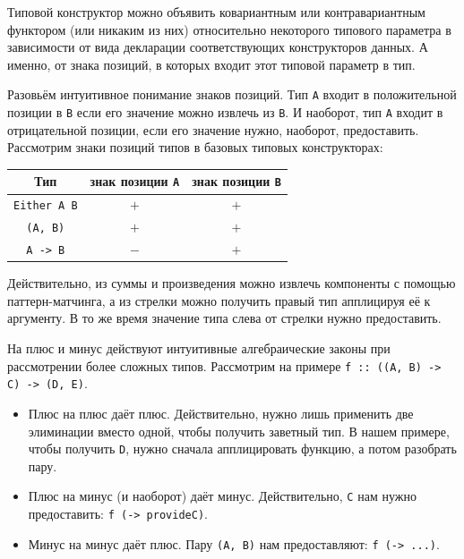 Типовой конструктор можно объявить ковариантным или контравариантным функтором (или никаким из них) относительно некоторого типового параметра в зависимости от вида декларации соответствующих конструкторов данных.
А именно, от знака позиций, в которых входит этот типовой параметр в тип.

Разовьём интуитивное понимание знаков позиций.
Тип \texttt{A} входит в положительной позиции в \texttt{B} если его значение можно извлечь из \texttt{B}.
И наоборот, тип \texttt{A} входит в отрицательной позиции, если его значение нужно, наоборот, предоставить.
Рассмотрим знаки позиций типов в базовых типовых конструкторах:
\begin{center}
    \begin{tabular}[h]{|c|c|c|}
        \hline
        Тип                              & знак позиции \texttt{A} & знак позиции \texttt{B} \\
        \hline
        \texttt{Either A B} & $+$                                  & $+$                                  \\
        \texttt{(A, B)}     & $+$                                  & $+$                                  \\
        \texttt{A -> B}     & $-$                                  & $+$                                  \\
        \hline
    \end{tabular}
\end{center}

Действительно, из суммы и произведения можно извлечь компоненты с помощью паттерн-матчинга, а из стрелки можно получить правый тип апплицируя её к аргументу.
В то же время значение типа слева от стрелки нужно предоставить.

На плюс и минус действуют интуитивные алгебраические законы при рассмотрении более сложных типов.
Рассмотрим на примере \texttt{f :: ((A, B) -> C) -> (D, E)}.
\begin{itemize}
    \item Плюс на плюс даёт плюс.
    Действительно, нужно лишь применить две элиминации вместо одной, чтобы получить заветный тип.
    В нашем примере, чтобы получить \texttt{D}, нужно сначала апплицировать функцию, а потом разобрать пару.
    \item Плюс на минус (и наоборот) даёт минус.
    Действительно, \texttt{C} нам нужно предоставить: \texttt{f (\ab -> provideC)}.
    \item Минус на минус даёт плюс.
    Пару \texttt{(A, B)} нам предоставляют: \texttt{f (\ab -> ...)}.
\end{itemize}

